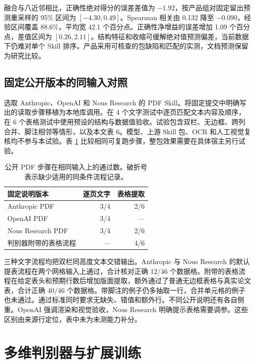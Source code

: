 \documentclass[final,5p,twocolumn,10pt]{elsarticle}
\begin{document}
融合与八近邻相比，正确性绝对得分的误差差值为 $-1.92$，按产品组对固定留出预测重采样的 95\% 区间为 $[-4.30,0.49]$。Spearman 相关由 0.132 降至 $-0.090$，经验区间覆盖 88.6\%，平均宽 42.1 个百分点。正确性净增益的误差增加 1.09 个百分点，差值区间为 $[0.26,2.11]$。结构特征和收缩可缓解绝对值预测偏差，当前数据下仍难对单个 Skill 排序。产品采用可核查的包缺陷和匹配的实测，文档预测保留为研究比较。

\subsection{固定公开版本的同输入对照}

选取 Anthropic、OpenAI 和 Nous Research 的 PDF Skill\cite{anthropic,openaipdf,hermespdf}。将固定提交中明确写出的读取步骤移植为本地库调用。在 4 个文字测试中逐页匹配文本内容及顺序，在 6 个表格测试中使用预设的结构与数据值验收。试验包含双栏、无边框、跨列合并、脚注相邻等情形，以及本文表 6。模型、上游 Skill 包、OCR 和人工视觉复核均不参与本试验。表 \ref{tab:profile-replay} 比较相同可复跑步骤，整包效果需要在具体宿主另行试验。

\begin{table}[!ht]
\centering\small
\caption{公开 PDF 步骤在相同输入上的通过数。破折号表示缺少适用的同条件流程记录。}
\label{tab:profile-replay}
\begin{tabularx}{\columnwidth}{@{}Xrr@{}}
\toprule
固定说明版本 & 逐页文字 & 表格提取 \\
\midrule
Anthropic PDF & 3/4 & 2/6 \\
OpenAI PDF & 3/4 & --- \\
Nous Research PDF & 3/4 & 2/6 \\
判别器附带的表格流程 & --- & 4/6 \\
\bottomrule
\end{tabularx}
\end{table}

三种文字流程均把双栏同高度文本交错输出。Anthropic 与 Nous Research 的默认提表流程在两个网格输入上通过，合计核对正确 12/46 个数据格。附带的表格流程在给定表头和预期行数后增加版面提取，额外通过了普通无边框表格与真实论文表，合计正确 40/46 个数据格。带脚注的例子仍多抽取一行，合并单元格的例子也未通过。通过标准同时要求无缺失、错值和额外行。不同公开说明还有各自侧重。OpenAI 强调渲染和视觉验收，Nous Research 明确提示表格需要调参。这些区别由来源行定位，表中未为未测能力补分。

\section{多维判别器与扩展训练}\label{sec:multi-axis}
\end{document}
